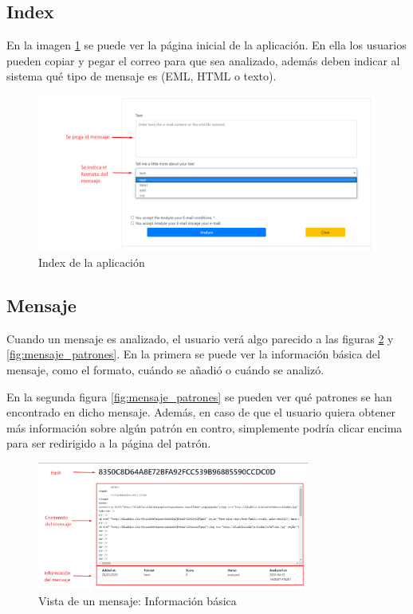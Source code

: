 \subsection{Index}
En la imagen \ref{fig:index} se puede ver la página inicial de la aplicación. 
En ella los usuarios pueden copiar y pegar el correo para que sea analizado, además deben indicar al sistema qué tipo de mensaje es (EML, HTML o texto).
\begin{figure}[htb]
    \centering
    \includegraphics[width=\textwidth]{imagenes/capturasAplicacion/Analizar_mensaje.png}
\caption{Index de la aplicación}
\label{fig:index}
\end{figure}

\subsection{Mensaje}
Cuando un mensaje es analizado, el usuario verá algo parecido a las figuras \ref{fig:mensaje_datos} y \ref{fig:mensaje_patrones}. En la primera se puede ver la información básica del mensaje, como el formato, cuándo se añadió o cuándo se analizó. 

En la segunda figura \ref{fig:mensaje_patrones} se pueden ver qué patrones se han encontrado en dicho mensaje. Además, en caso de que el usuario quiera obtener más información sobre algún patrón en contro, simplemente podría clicar encima para ser redirigido a la página del patrón. 

\begin{figure}[htb]
    \centering
    \includegraphics[width=0.8\textwidth]{imagenes/capturasAplicacion/Mensaje_info.png}
\caption{Vista de un mensaje: Información básica}
\label{fig:mensaje_datos}
\end{figure}

